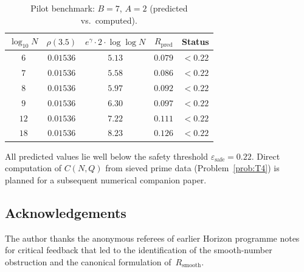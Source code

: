 \documentclass[11pt,reqno]{amsart}
\theoremstyle{plain}
\theoremstyle{definition}
\theoremstyle{remark}
\newcommand{\Rsmooth}{R_{\mathrm{smooth}}}
\newcommand{\eps}{\varepsilon}
\begin{document}
\begin{table}[h]
\centering
\caption{Pilot benchmark: $B = 7$, $A = 2$ (predicted vs.\ computed).}
\label{tab:pilot}
\smallskip
\begin{tabular}{@{}ccccc@{}}
\toprule
$\log_{10} N$ & $\rho(3.5)$ & $e^{\gamma} \cdot 2 \cdot \log\log N$
& $R_{\mathrm{pred}}$ & Status \\
\midrule
$6$ & $0.01536$ & $5.13$ & $0.079$ & $< 0.22$ \\
$7$ & $0.01536$ & $5.58$ & $0.086$ & $< 0.22$ \\
$8$ & $0.01536$ & $5.97$ & $0.092$ & $< 0.22$ \\
$9$ & $0.01536$ & $6.30$ & $0.097$ & $< 0.22$ \\
$12$ & $0.01536$ & $7.22$ & $0.111$ & $< 0.22$ \\
$18$ & $0.01536$ & $8.23$ & $0.126$ & $< 0.22$ \\
\bottomrule
\end{tabular}
\end{table}

All predicted values lie well below the safety threshold
$\eps_{\mathrm{safe}} = 0.22$. Direct computation of $C(N,Q)$ from
sieved prime data (Problem~\ref{prob:T4}) is planned for a
subsequent numerical companion paper.


\subsection*{Acknowledgements}
The author thanks the anonymous referees of earlier Horizon programme
notes for critical feedback that led to the identification of the
smooth-number obstruction and the canonical formulation of~$\Rsmooth$.
\end{document}
